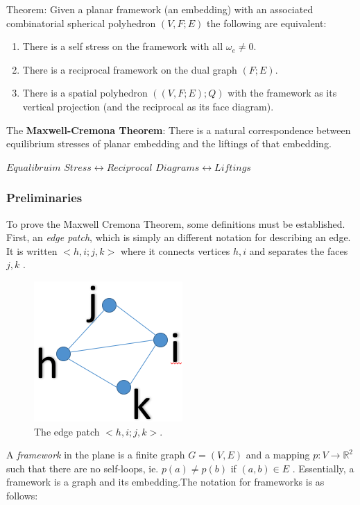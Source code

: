 \documentclass[11pt]{article}
\newcommand{\R}{\mathbb{R}}
\begin{document}
Theorem: Given a planar framework (an embedding) with an associated combinatorial spherical polyhedron $(V,F;E)$ the following are equivalent:
\begin{enumerate}
	\item There is a self stress on the framework with all $\omega_e \neq 0$.
	\item There is a reciprocal framework on the dual graph $(F;E)$.
	\item There is a spatial polyhedron $((V,F;E);Q)$ with the framework as its vertical projection (and the reciprocal as its face diagram).
 \end{enumerate}
 
 The \textbf{Maxwell-Cremona Theorem}: There is a natural correspondence between equilibrium stresses of planar embedding and the liftings of that embedding.
 
 $Equalibruim$  $Stress \leftrightarrow Reciprocal$ $Diagrams \leftrightarrow Liftings$
 
\subsubsection{Preliminaries}
To prove the Maxwell Cremona Theorem, some definitions must be established. First, an \emph{edge patch}, which is simply an different notation for describing an edge. It is written $<h,i;j,k>$ where it connects vertices $h,i$ and separates the faces $j,k$ \cite{mccProof}.
\begin{figure}[h]
      \centering
      \includegraphics[scale=.3]{edge_patch2}       
      \caption{The edge patch $<h,i;j,k>$.}
      \label{fig: Figure 4}
  \end{figure}
  
A \emph{framework} in the plane is a finite graph $G=(V,E)$ and a mapping $p: V \rightarrow \R^2$ such that there are no self-loops, ie. $p(a) \neq p(b)$ if $(a,b) \in E$ \cite{mccProof}. Essentially, a framework is a graph and its embedding.The notation for frameworks is as follows: 
\end{document}
